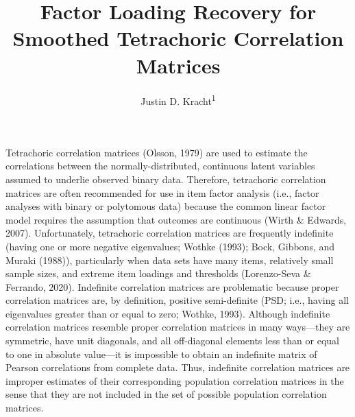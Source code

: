 \documentclass[
  english,
  man]{apa6}
\title{Factor Loading Recovery for Smoothed Tetrachoric Correlation Matrices}
\author{Justin D. Kracht\textsuperscript{1}}
\date{}
\affiliation{\vspace{0.5cm}\textsuperscript{1} University of Minnesota}
\begin{document}
\maketitle

\newcommand{\Rsm}{\mathbf{R}_{\textrm{Sm}}}
\newcommand{\Rpop}{\mathbf{R}_{\textrm{Pop}}}
\newcommand{\Rnpd}{\mathbf{R}_{-}}
\newcommand{\Rapa}{\mathbf{R}_{\textrm{APA}}}
\newcommand{\Rby}{\mathbf{R}_{\textrm{BY}}}
\newcommand{\Rkb}{\mathbf{R}_{\textrm{KB}}}
\newcommand{\dg}{\textrm{dg}}
\newcommand{\Diag}{\textrm{Diag}}
\newcommand{\RMSE}{\textrm{RMSE}(\mathbf{F}, \hat{\mathbf{F}})}
\newcommand{\Ds}{\mathrm{D}_{\mathrm{s}}(\Rsm, \Rpop)}

Tetrachoric correlation matrices (Olsson, 1979) are used to estimate the correlations between the normally-distributed, continuous latent variables assumed to underlie observed binary data. Therefore, tetrachoric correlation matrices are often recommended for use in item factor analysis (i.e., factor analyses with binary or polytomous data) because the common linear factor model requires the assumption that outcomes are continuous (Wirth \& Edwards, 2007). Unfortunately, tetrachoric correlation matrices are frequently indefinite (having one or more negative eigenvalues; Wothke (1993); Bock, Gibbons, and Muraki (1988)), particularly when data sets have many items, relatively small sample sizes, and extreme item loadings and thresholds (Lorenzo-Seva \& Ferrando, 2020). Indefinite correlation matrices are problematic because proper correlation matrices are, by definition, positive semi-definite (PSD; i.e., having all eigenvalues greater than or equal to zero; Wothke, 1993). Although indefinite correlation matrices resemble proper correlation matrices in many ways---they are symmetric, have unit diagonals, and all off-diagonal elements less than or equal to one in absolute value---it is impossible to obtain an indefinite matrix of Pearson correlations from complete data. Thus, indefinite correlation matrices are improper estimates of their corresponding population correlation matrices in the sense that they are not included in the set of possible population correlation matrices.
\end{document}
